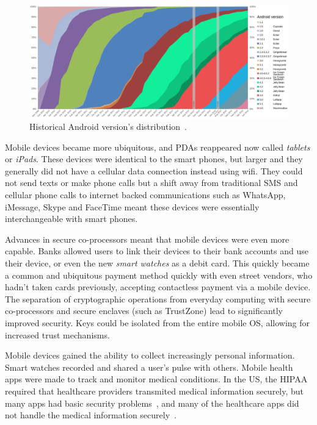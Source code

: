 \documentclass[thesis.tex]{subfiles}
\begin{document}
\begin{figure}
\centering
\includegraphics[width=\linewidth]{figures/android-versions.pdf}
\caption[Historical Android version's distribution.]{Historical Android
  version's distribution~\cite{erikrespo_android_2017}.}
\label{fig:android-versions}
\end{figure}

Mobile devices became more ubiquitous, and \acp{PDA} reappeared now
called \emph{tablets} or \emph{iPads}.  These devices were identical
to the smart phones, but larger and they generally did not have a
cellular data connection instead using wifi. They could not send
texts or make phone calls but a shift away from traditional SMS and
cellular phone calls to internet backed communications such as
WhatsApp, iMessage, Skype and FaceTime meant these devices were
essentially interchangeable with smart phones.

Advances in secure co-processors meant that mobile devices were even
more capable.  Banks allowed users to link their devices to their bank
accounts and use their device, or even the new \emph{smart watches} as
a debit card.  This quickly became a common and ubiquitous payment
method quickly with even street vendors, who hadn't taken cards
previously, accepting contactless payment via a mobile device.  The
separation of cryptographic operations from everyday computing with
secure co-processors and secure enclaves (such as TrustZone) lead to
significantly improved security.  Keys could be isolated from the
entire mobile OS, allowing for increased trust mechanisms.

Mobile devices gained the ability to collect increasingly personal
information.  Smart watches recorded and shared a user's pulse with
others. Mobile health apps were made to track and monitor medical
conditions. In the US, the \ac{HIPAA} required that healthcare
providers transmited medical information securely, but many apps had
basic security problems~\cite{fahl_why_2012}, and many of the
healthcare apps did not handle the medical information
securely~\cite{knorr_privacy_2015}.
\end{document}
